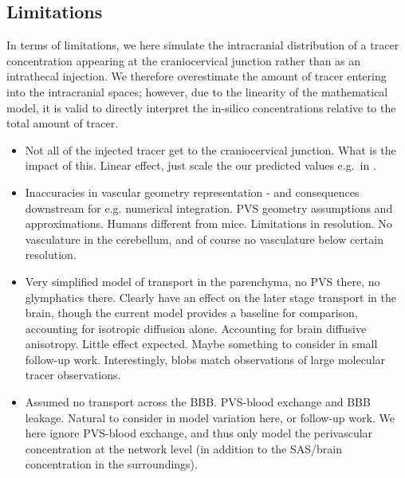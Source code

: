 \documentclass[fleqn,10pt]{wlscirep}
\begin{document}
\subsection*{Limitations}

In terms of limitations, we here simulate the intracranial
distribution of a tracer concentration appearing at the craniocervical
junction rather than as an intrathecal injection. We therefore
overestimate the amount of tracer entering into the intracranial
spaces; however, due to the linearity of the mathematical model, it is
valid to directly interpret the in-silico concentrations relative to
the total amount of tracer.

\begin{itemize}
\item
  Not all of the injected tracer get to the craniocervical
  junction. What is the impact of this. Linear effect, just scale the
  our predicted values e.g.~in .
\item 
  Inaccuracies in vascular geometry representation - and consequences
  downstream for e.g. numerical integration. PVS geometry assumptions
  and approximations. Humans different from mice. Limitations in
  resolution. No vasculature in the cerebellum, and of course no
  vasculature below certain resolution.
\item
  Very simplified model of transport in the parenchyma, no PVS there,
  no glymphatics there. Clearly have an effect on the later stage
  transport in the brain, though the current model provides a baseline
  for comparison, accounting for isotropic diffusion alone.
  Accounting for brain diffusive anisotropy. Little effect
  expected. Maybe something to consider in small follow-up
  work. Interestingly, blobs match observations of large molecular
  tracer observations.

\item
  Assumed no transport across the BBB. PVS-blood exchange and BBB
  leakage. Natural to consider in model variation here, or follow-up
  work. We here ignore PVS-blood exchange, and thus only model the
  perivascular concentration at the network level (in addition to the
  SAS/brain concentration in the surroundings).
\end{itemize}
\end{document}
